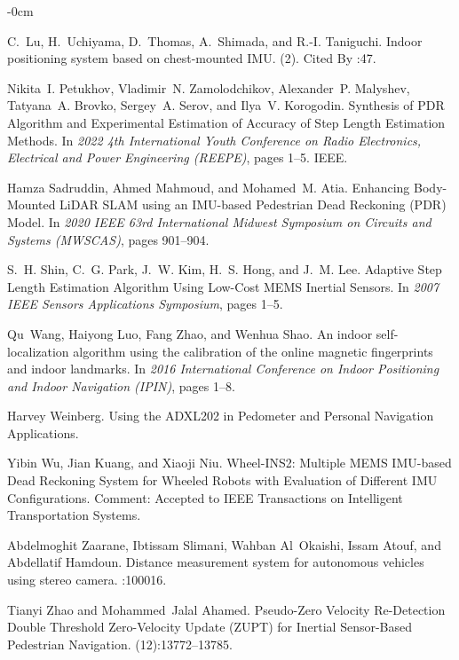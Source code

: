 \documentclass[engproc,conferenceproceedings,submit,pdftex,moreauthors]{Definitions/mdpi}
\begin{document}
\begin{adjustwidth}{-\extralength}{0cm}
\begin{thebibliography}{999}
C.~Lu, H.~Uchiyama, D.~Thomas, A.~Shimada, and R.-I. Taniguchi.
\newblock Indoor positioning system based on chest-mounted {{IMU}}.
(2).
\newblock Cited By :47.

Nikita~I. Petukhov, Vladimir~N. Zamolodchikov, Alexander~P. Malyshev,
Tatyana~A. Brovko, Sergey~A. Serov, and Ilya~V. Korogodin.
\newblock Synthesis of {{PDR Algorithm}} and {{Experimental Estimation}} of
{{Accuracy}} of {{Step Length Estimation Methods}}.
\newblock In {\em 2022 4th {{International Youth Conference}} on {{Radio
			Electronics}}, {{Electrical}} and {{Power Engineering}} ({{REEPE}})}, pages
1--5. {IEEE}.

Hamza Sadruddin, Ahmed Mahmoud, and Mohamed~M. Atia.
\newblock Enhancing {{Body-Mounted LiDAR SLAM}} using an {{IMU-based Pedestrian
		Dead Reckoning}} ({{PDR}}) {{Model}}.
\newblock In {\em 2020 {{IEEE}} 63rd {{International Midwest Symposium}} on
	{{Circuits}} and {{Systems}} ({{MWSCAS}})}, pages 901--904.

S.~H. Shin, C.~G. Park, J.~W. Kim, H.~S. Hong, and J.~M. Lee.
\newblock Adaptive {{Step Length Estimation Algorithm Using Low-Cost MEMS
		Inertial Sensors}}.
\newblock In {\em 2007 {{IEEE Sensors Applications Symposium}}}, pages 1--5.

Qu~Wang, Haiyong Luo, Fang Zhao, and Wenhua Shao.
\newblock An indoor self-localization algorithm using the calibration of the
online magnetic fingerprints and indoor landmarks.
\newblock In {\em 2016 {{International Conference}} on {{Indoor Positioning}}
	and {{Indoor Navigation}} ({{IPIN}})}, pages 1--8.

Harvey Weinberg.
\newblock Using the {{ADXL202}} in {{Pedometer}} and {{Personal Navigation
		Applications}}.

Yibin Wu, Jian Kuang, and Xiaoji Niu.
\newblock Wheel-{{INS2}}: {{Multiple MEMS IMU-based Dead Reckoning System}} for
{{Wheeled Robots}} with {{Evaluation}} of {{Different IMU Configurations}}.
\newblock Comment: Accepted to IEEE Transactions on Intelligent Transportation
Systems.

Abdelmoghit Zaarane, Ibtissam Slimani, Wahban Al~Okaishi, Issam Atouf, and
Abdellatif Hamdoun.
\newblock Distance measurement system for autonomous vehicles using stereo
camera.
:100016.

Tianyi Zhao and Mohammed~Jalal Ahamed.
\newblock Pseudo-{{Zero Velocity Re-Detection Double Threshold Zero-Velocity
		Update}} ({{ZUPT}}) for {{Inertial Sensor-Based Pedestrian Navigation}}.
(12):13772--13785.


\end{thebibliography}
\end{adjustwidth}
\end{document}
